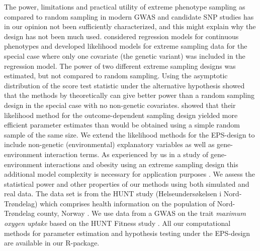 \documentclass[10pt,a4paper]{article}
\begin{document}
The power, limitations and practical utility of extreme phenotype sampling as compared to random sampling in modern GWAS and candidate SNP studies has in our opinion not been sufficiently characterized, and this might explain why the design has not been much used. \cite{huang2007eps} considered regression models for continuous phenotypes and developed likelihood models for extreme sampling data for the special case where only one covariate (the genetic variant) was included in the regression model. The power of two different extreme sampling designs was estimated, but not compared to random sampling. Using the asymptotic distribution of the score test statistic under the alternative hypothesis \cite{tang2010equivalence} showed that the methods by \cite{huang2007eps} theoretically can give better power than a random sampling design in the special case with no non-genetic covariates. \cite{zhou2002semiparametric} showed that their likelihood method for the outcome-dependent sampling design yielded more efficient parameter estimates than would be obtained using a simple random sample of the same size. We extend the likelihood methods for the EPS-design to include non-genetic (environmental) explanatory variables as well as gene-environment interaction terms. As experienced by us in a study of gene-environment interactions and obesity using an extreme sampling design this additional model complexity is necessary for application purposes \citep{WHRbjornland}. We assess the statistical power and other properties of our methods using both simulated and real data. The data set is from the HUNT study (Helseundersøkelsen i Nord-Trøndelag) which comprises health information on the population of Nord-Trøndelag county, Norway \citep{HUNT}. We use data from a GWAS on the trait \textit{maximum oxygen uptake} based on the HUNT Fitness study \citep{aspenes2011physical}. All our computational methods for parameter estimation and hypothesis testing under the EPS-design are available in our R-package.
\end{document}
